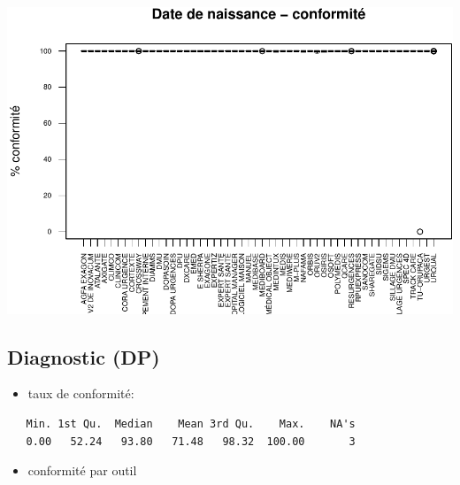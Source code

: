 \documentclass[]{article}
\providecommand{\tightlist}{%
  \setlength{\itemsep}{0pt}\setlength{\parskip}{0pt}}
\begin{document}
\includegraphics{septembre2015_files/figure-latex/unnamed-chunk-15-1.pdf}

\subsection{Diagnostic (DP)}\label{diagnostic-dp}

\begin{itemize}
\tightlist
\item
  taux de conformité:
\end{itemize}

\begin{verbatim}
   Min. 1st Qu.  Median    Mean 3rd Qu.    Max.    NA's 
   0.00   52.24   93.80   71.48   98.32  100.00       3 
\end{verbatim}

\begin{itemize}
\tightlist
\item
  conformité par outil
\end{itemize}
\end{document}

